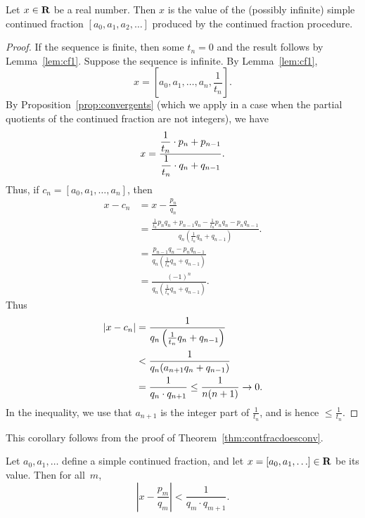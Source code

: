 \begin{theorem}\label{thm:contfracdoesconv}
Let $x\in\mathbf{R}$ be a real number.  Then $x$ is the value
of the (possibly infinite) simple continued fraction
$
  [a_0, a_1, a_2, \ldots]
$
produced by the continued fraction procedure.
\end{theorem}
\begin{proof}
If the sequence is finite, then some $t_n=0$ and the
result follows by Lemma~\ref{lem:cf1}.
Suppose the sequence is infinite.
By Lemma~\ref{lem:cf1},
$$
  x = [a_0, a_1, \ldots, a_n, \frac{1}{t_n}].
$$
By Proposition~\ref{prop:convergents} (which we apply in a case when
the partial quotients of the continued fraction are not integers),
we have
$$
  x = \frac{\displaystyle\frac{1}{t_n} \cdot p_n + p_{n-1}}{\displaystyle\frac{1}{t_n}\cdot q_n + q_{n-1}}.
$$
Thus, if $c_n = [a_0, a_1, \ldots, a_n]$, then
\begin{align*}
x - c_n &= x - \frac{p_n}{q_n}\\
      &=\frac{\frac{1}{t_n} p_n q_n + p_{n-1} q_n - \frac{1}{t_n} p_n q_n - p_n q_{n-1}}
        {q_n \left(\frac{1}{t_n} q_n + q_{n-1}\right)}.\\
      &= \frac{p_{n-1} q_n - p_{n}q_{n-1}}{q_n\left(\frac{1}{t_n} q_n + q_{n-1}\right)} \\
      &= \frac{(-1)^n}{q_n\left(\frac{1}{t_n} q_n + q_{n-1}\right)}.
\end{align*}
Thus
\begin{align*}
 |x - c_n| &= \frac{1}{q_n\left(\frac{1}{t_n} q_n + q_{n-1}\right)} \\
           &< \frac{1}{q_n(a_{n+1} q_n + q_{n-1})} \\
           &= \frac{1}{q_n \cdot q_{n+1}} \leq \frac{1}{n(n+1)} \rightarrow 0.
\end{align*}
In the inequality, we use that $a_{n+1}$ is the integer part of
$\frac{1}{t_n}$, and is hence $\leq \frac{1}{t_n}$.
\end{proof}

This corollary follows from the proof of Theorem~\ref{thm:contfracdoesconv}.
\begin{corollary}\label{cor:cfconv}%
%
Let $a_0,a_1,\ldots$ define a simple continued
fraction, and let $x=[a_0,a_1,\ldots]\in\mathbf{R}$ be its value.
Then for all~$m$,
$$
  \left| x - \frac{p_m}{q_m}\right|
  < \frac{1}{q_m \cdot q_{m+1}}.
$$
\end{corollary}

